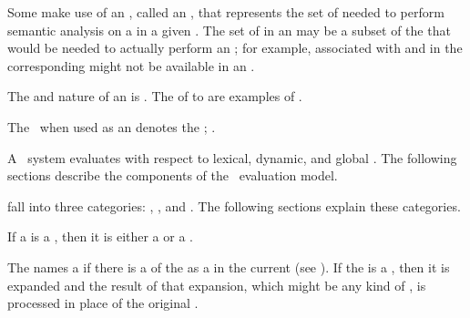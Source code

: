 \endsubsubsection%


Some  make use of an , 
called an ,
that represents the set of  needed to perform
semantic analysis on a  in a given .
The set of  in an 
may be a subset of the  that would be needed to actually 
perform an ; for example,  associated with
  and  in the corresponding
 might not be available in an .

The  and nature of an  is .
The  of  to 
are examples of .

The  \nil\ when used as an 
 denotes the ;
\seesection\NullLexicalEnv.

\endsubsubsection%

\endSubsection%


A \clisp\ system evaluates  with respect to lexical,
dynamic, and global .  The following sections
describe the components of the \clisp\ evaluation model.


 fall into three categories:
, , and .
The following sections explain these categories.
                                            

If a  is a ,
then it is either a  or a .

The  names a  
if there is a  of the  as a 
in the current  (see ).
If the  is a , then it is expanded 
and the result of that expansion, which might be any kind of , 
is processed in place of the original .

